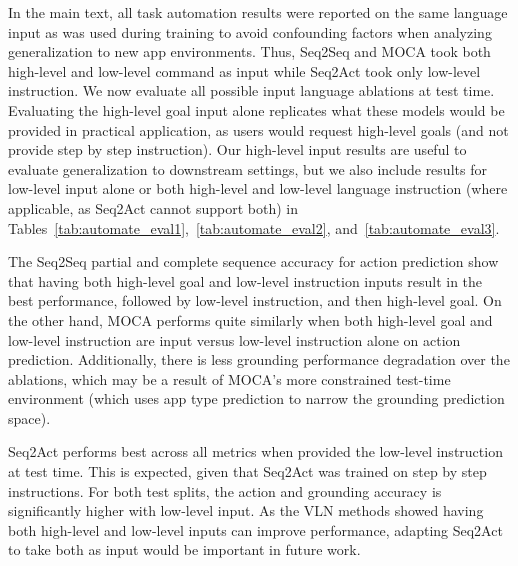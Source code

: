 In the main text, all task automation results were reported on the same language input as was used during training to avoid confounding factors when analyzing generalization to new app environments. Thus, Seq2Seq and MOCA took both high-level and low-level command as input while Seq2Act took only low-level instruction. We now evaluate all possible input language ablations at test time. Evaluating the high-level goal input alone replicates what these models would be provided in practical application, as users would request high-level goals (and not provide step by step instruction). Our high-level input results are useful to evaluate generalization to downstream settings, but we also include results for low-level input alone or both high-level and low-level language instruction (where applicable, as Seq2Act cannot support both) in Tables~\ref{tab:automate_eval1},~\ref{tab:automate_eval2}, and~\ref{tab:automate_eval3}.

The Seq2Seq partial and complete sequence accuracy for action prediction show that having both high-level goal and low-level instruction inputs result in the best performance, followed by low-level instruction, and then high-level goal. On the other hand, MOCA performs quite similarly when both high-level goal and low-level instruction are input versus low-level instruction alone on action prediction. Additionally, there is less grounding performance degradation over the ablations, which may be a result of MOCA's more constrained test-time environment (which uses app type prediction to narrow the grounding prediction space).

Seq2Act performs best across all metrics when provided the low-level instruction at test time. This is expected, given that Seq2Act was trained on step by step instructions. For both test splits, the action and grounding accuracy is significantly higher with low-level input. As the VLN methods showed having both high-level and low-level inputs can improve performance, adapting Seq2Act to take both as input would be important in future work.

